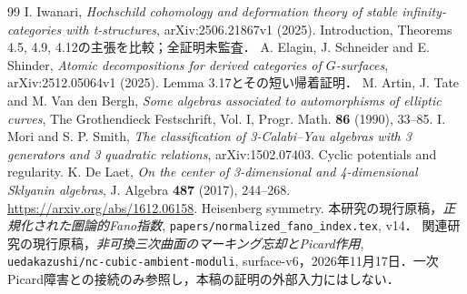 \documentclass[11pt,a4paper]{ltjsarticle}
\begin{document}
\begin{thebibliography}{99}
 I. Iwanari, \emph{Hochschild cohomology and deformation theory of stable infinity-categories with t-structures}, arXiv:2506.21867v1 (2025). Introduction, Theorems 4.5, 4.9, 4.12の主張を比較；全証明未監査．
 A. Elagin, J. Schneider and E. Shinder, \emph{Atomic decompositions for derived categories of $G$-surfaces}, arXiv:2512.05064v1 (2025). Lemma 3.17とその短い帰着証明．
 M. Artin, J. Tate and M. Van den Bergh,
\emph{Some algebras associated to automorphisms of elliptic curves},
The Grothendieck Festschrift, Vol. I, Progr. Math. \textbf{86} (1990), 33--85.
 I. Mori and S. P. Smith,
\emph{The classification of 3-Calabi--Yau algebras with 3 generators and 3 quadratic relations},
arXiv:1502.07403. Cyclic potentials and regularity.
 K. De Laet,
\emph{On the center of 3-dimensional and 4-dimensional Sklyanin algebras},
J. Algebra \textbf{487} (2017), 244--268.
\url{https://arxiv.org/abs/1612.06158}. Heisenberg symmetry.
 本研究の現行原稿，\emph{正規化された圏論的Fano指数}, \texttt{papers/normalized\_fano\_index.tex}, v14．
 関連研究の現行原稿，\emph{非可換三次曲面のマーキング忘却とPicard作用}, \texttt{uedakazushi/nc-cubic-ambient-moduli}, surface-v6，2026年11月17日．一次Picard障害との接続のみ参照し，本稿の証明の外部入力にはしない．
\end{thebibliography}
\endgroup
\end{document}
